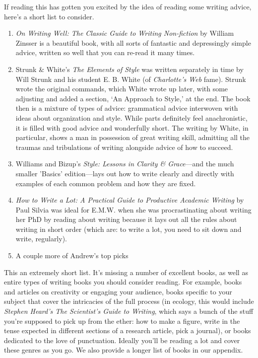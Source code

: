\documentclass[11pt,letter]{article}
\begin{document}
If reading this has gotten you excited by the idea of reading some writing advice, here's a short list to consider. 
\begin{enumerate}
\item \emph{On Writing Well: The Classic Guide to Writing Non-fiction} by William Zinsser is a beautiful book, with all sorts of fantastic and depressingly simple advice, written so well that you can re-read it many times. 
\item Strunk \& White’s \emph{The Elements of Style} was written separately in time by Will Strunk and his student E. B. White (of \emph{Charlotte’s Web} fame). Strunk wrote the original commands, which White wrote up later, with some adjusting and added a section, `An Approach to Style,’ at the end. The book then is a mixture of types of advice: grammatical advice interwoven with ideas about organization and style. While parts definitely feel anachronistic, it is filled with good advice and wonderfully short. The writing by White, in particular, shows a man in possession of great writing skill, admitting all the traumas and tribulations of writing alongside advice of how to succeed. 
\item Williams and Bizup's \emph{Style: Lessons in Clarity \& Grace}---and the much smaller 'Basics' edition---lays out how to write clearly and directly with examples of each common problem and how they are fixed. 
\item \emph{How to Write a Lot: A Practical Guide to Productive Academic Writing} by Paul Silvia was ideal for E.M.W. when she was procrastinating about writing her PhD by reading about writing because it lays out all the rules about writing in short order (which are: to write a lot, you need to sit down and write, regularly). 
\item A couple more of Andrew's top picks
\end{enumerate}

This an extremely short list. It's missing a number of excellent books, as well as entire types of writing books you should consider reading. For example, books and articles on creativity or engaging your audience, books specific to your subject that cover the intricacies of the full process (in ecology, this would include \emph{Stephen Heard’s The Scientist’s Guide to Writing}, which says a bunch of the stuff you’re supposed to pick up from the ether: how to make a figure, write in the tense expected in different sections of a research article, pick a journal), or books dedicated to the love of punctuation. Ideally you'll be reading a lot and cover these genres as you go. We also provide a longer list of books in our appendix. 
\end{document}
